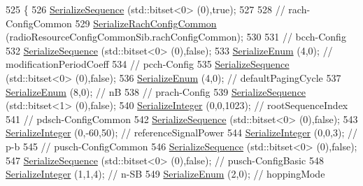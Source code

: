 \begin{DoxyCode}
525 \{
526   \hyperlink{classns3_1_1Asn1Header_aa9744858380443ed95836fed08799aed}{SerializeSequence} (std::bitset<0> (0),\textcolor{keyword}{true});
527 
528   \textcolor{comment}{// rach-ConfigCommon}
529   \hyperlink{classns3_1_1RrcAsn1Header_af915db4fdcfa7d2acb1748d0007afe70}{SerializeRachConfigCommon} (radioResourceConfigCommonSib.rachConfigCommon);
530 
531   \textcolor{comment}{// bcch-Config }
532   \hyperlink{classns3_1_1Asn1Header_aa9744858380443ed95836fed08799aed}{SerializeSequence} (std::bitset<0> (0),\textcolor{keyword}{false});
533   \hyperlink{classns3_1_1Asn1Header_ac8e56956823ab8e4470c09e162e7bf24}{SerializeEnum} (4,0); \textcolor{comment}{// modificationPeriodCoeff}
534   \textcolor{comment}{// pcch-Config }
535   \hyperlink{classns3_1_1Asn1Header_aa9744858380443ed95836fed08799aed}{SerializeSequence} (std::bitset<0> (0),\textcolor{keyword}{false});
536   \hyperlink{classns3_1_1Asn1Header_ac8e56956823ab8e4470c09e162e7bf24}{SerializeEnum} (4,0); \textcolor{comment}{// defaultPagingCycle}
537   \hyperlink{classns3_1_1Asn1Header_ac8e56956823ab8e4470c09e162e7bf24}{SerializeEnum} (8,0); \textcolor{comment}{// nB}
538   \textcolor{comment}{// prach-Config }
539   \hyperlink{classns3_1_1Asn1Header_aa9744858380443ed95836fed08799aed}{SerializeSequence} (std::bitset<1> (0),\textcolor{keyword}{false});
540   \hyperlink{classns3_1_1Asn1Header_ab1c3bd37730affa7473bc759d625c29a}{SerializeInteger} (0,0,1023); \textcolor{comment}{// rootSequenceIndex}
541   \textcolor{comment}{// pdsch-ConfigCommon }
542   \hyperlink{classns3_1_1Asn1Header_aa9744858380443ed95836fed08799aed}{SerializeSequence} (std::bitset<0> (0),\textcolor{keyword}{false});
543   \hyperlink{classns3_1_1Asn1Header_ab1c3bd37730affa7473bc759d625c29a}{SerializeInteger} (0,-60,50); \textcolor{comment}{// referenceSignalPower}
544   \hyperlink{classns3_1_1Asn1Header_ab1c3bd37730affa7473bc759d625c29a}{SerializeInteger} (0,0,3); \textcolor{comment}{// p-b}
545   \textcolor{comment}{// pusch-ConfigCommon }
546   \hyperlink{classns3_1_1Asn1Header_aa9744858380443ed95836fed08799aed}{SerializeSequence} (std::bitset<0> (0),\textcolor{keyword}{false});
547   \hyperlink{classns3_1_1Asn1Header_aa9744858380443ed95836fed08799aed}{SerializeSequence} (std::bitset<0> (0),\textcolor{keyword}{false}); \textcolor{comment}{// pusch-ConfigBasic}
548   \hyperlink{classns3_1_1Asn1Header_ab1c3bd37730affa7473bc759d625c29a}{SerializeInteger} (1,1,4); \textcolor{comment}{// n-SB}
549   \hyperlink{classns3_1_1Asn1Header_ac8e56956823ab8e4470c09e162e7bf24}{SerializeEnum} (2,0); \textcolor{comment}{// hoppingMode}

\end{DoxyCode}
